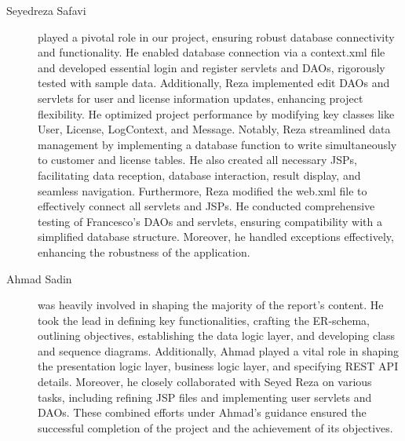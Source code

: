 \begin{description}
	\item[Seyedreza Safavi
] played a pivotal role in our project, ensuring robust database connectivity and functionality. He enabled database connection via a context.xml file and developed essential login and register servlets and DAOs, rigorously tested with sample data. Additionally, Reza implemented edit DAOs and servlets for user and license information updates, enhancing project flexibility. He optimized project performance by modifying key classes like User, License, LogContext, and Message. Notably, Reza streamlined data management by implementing a database function to write simultaneously to customer and license tables. He also created all necessary JSPs, facilitating data reception, database interaction, result display, and seamless navigation. Furthermore, Reza modified the web.xml file to effectively connect all servlets and JSPs. He conducted comprehensive testing of Francesco's DAOs and servlets, ensuring compatibility with a simplified database structure. Moreover, he handled exceptions effectively, enhancing the robustness of the application.
	\item[Ahmad Sadin
]was heavily involved in shaping the majority of the report's content. He took the lead in defining key functionalities, crafting the ER-schema, outlining objectives, establishing the data logic layer, and developing class and sequence diagrams. Additionally, Ahmad played a vital role in shaping the presentation logic layer, business logic layer, and specifying REST API details. Moreover, he closely collaborated with Seyed Reza on various tasks, including refining JSP files and implementing user servlets and DAOs. These combined efforts under Ahmad's guidance ensured the successful completion of the project and the achievement of its objectives.

\end{description}
